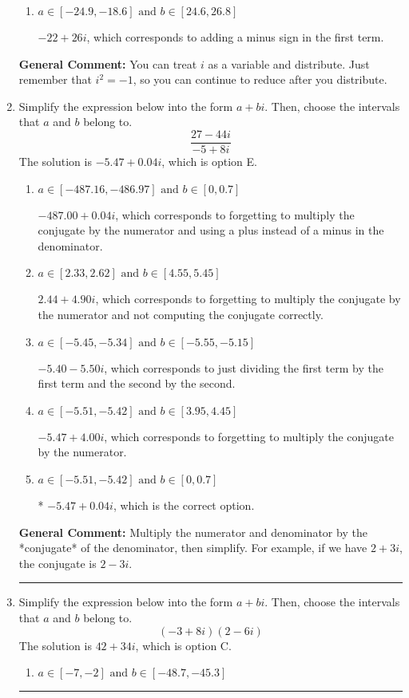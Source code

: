 \documentclass{extbook}[14pt]
\newcommand{\litem}[1]{\item #1

\rule{\textwidth}{0.4pt}}
\begin{document}
\begin{enumerate}
{\begin{enumerate}[label=\Alph*.]
 $-28 + 6 i$, which corresponds to just multiplying the real terms to get the real part of the solution and the coefficients in the complex terms to get the complex part.
\item \( a \in [-24.9, -18.6] \text{ and } b \in [24.6, 26.8] \)

 $-22 + 26 i$, which corresponds to adding a minus sign in the first term.
\end{enumerate}

\textbf{General Comment:} You can treat $i$ as a variable and distribute. Just remember that $i^2=-1$, so you can continue to reduce after you distribute.
}
\litem{
Simplify the expression below into the form $a+bi$. Then, choose the intervals that $a$ and $b$ belong to.
\[ \frac{27 - 44 i}{-5 + 8 i} \]The solution is \( -5.47  + 0.04 i \), which is option E.\begin{enumerate}[label=\Alph*.]
\item \( a \in [-487.16, -486.97] \text{ and } b \in [0, 0.7] \)

 $-487.00  + 0.04 i$, which corresponds to forgetting to multiply the conjugate by the numerator and using a plus instead of a minus in the denominator.
\item \( a \in [2.33, 2.62] \text{ and } b \in [4.55, 5.45] \)

 $2.44  + 4.90 i$, which corresponds to forgetting to multiply the conjugate by the numerator and not computing the conjugate correctly.
\item \( a \in [-5.45, -5.34] \text{ and } b \in [-5.55, -5.15] \)

 $-5.40  - 5.50 i$, which corresponds to just dividing the first term by the first term and the second by the second.
\item \( a \in [-5.51, -5.42] \text{ and } b \in [3.95, 4.45] \)

 $-5.47  + 4.00 i$, which corresponds to forgetting to multiply the conjugate by the numerator.
\item \( a \in [-5.51, -5.42] \text{ and } b \in [0, 0.7] \)

* $-5.47  + 0.04 i$, which is the correct option.
\end{enumerate}

\textbf{General Comment:} Multiply the numerator and denominator by the *conjugate* of the denominator, then simplify. For example, if we have $2+3i$, the conjugate is $2-3i$.
}
\litem{
Simplify the expression below into the form $a+bi$. Then, choose the intervals that $a$ and $b$ belong to.
\[ (-3 + 8 i)(2 - 6 i) \]The solution is \( 42 + 34 i \), which is option C.\begin{enumerate}[label=\Alph*.]
\item \( a \in [-7, -2] \text{ and } b \in [-48.7, -45.3] \)


\end{enumerate}}
\end{enumerate}
\end{document}
